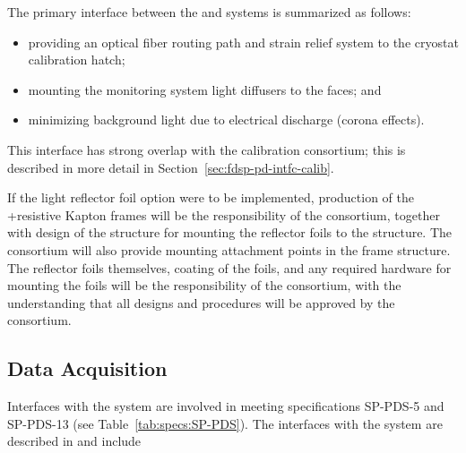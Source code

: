 The primary interface between the  and  systems is summarized as follows:
\begin{itemize}
    \item providing an optical fiber routing path and strain relief system to the cryostat calibration hatch;
    \item mounting the  monitoring system light diffusers to the  faces; and     
    \item minimizing background light due to electrical discharge (corona effects).
\end{itemize} 


This interface has strong overlap with the calibration consortium; this is described in more detail in Section~\ref{sec:fdsp-pd-intfc-calib}.

If the light reflector foil option were to be implemented, production of the \frfour{}+resistive Kapton  frames will be the responsibility of the  consortium, together with design of the structure for mounting the  reflector foils to the  structure.  The  consortium will also provide mounting attachment points in the  frame structure.
 The reflector foils themselves,  coating of the  foils, and any required hardware for mounting the foils will be the responsibility of the  consortium, with the understanding that all designs and procedures will be approved by the  consortium. 


\subsection{Data Acquisition}
\label{sec:fdsp-pd-intfc-daq}



Interfaces with the  system are involved in meeting specifications SP-PDS-5
and SP-PDS-13 (see Table~\ref{tab:specs:SP-PDS}).  The  interfaces with the  system are described in  and include

